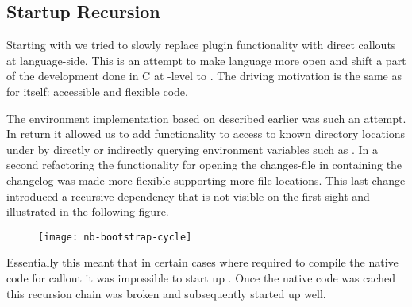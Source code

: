 \subsection{Startup Recursion}

Starting with  we tried to slowly replace \VM plugin functionality with direct \FFI callouts at language-side.
This is an attempt to make language more open and shift a part of the development done in C at \VM-level to \PH.
The driving motivation is the same as for \NB itself: accessible and flexible code.

The \OS environment implementation based on \NB described earlier was such an attempt.
In return it allowed us to add functionality to access to known directory locations under \Linux by directly or indirectly querying environment variables such as .
In a second refactoring the functionality for opening the changes-file in \PH containing the changelog was made more flexible supporting more file locations.
This last change introduced a recursive dependency that is not visible on the first sight and illustrated in the following figure.
%
\begin{figure}[h]
	\centering
	\texttt{[image: nb-bootstrap-cycle]}
\end{figure}
%
Essentially this meant that in certain cases where \NB required to compile the native code for callout it was impossible to start up \PH.
Once the native code was cached this recursion chain was broken and subsequently \PH started up well.

